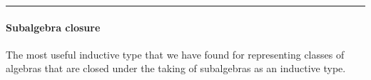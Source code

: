 \begin{center}\rule{0.5\linewidth}{\linethickness}\end{center}

\paragraph{Subalgebra closure}\label{subalgebra-closure}

The most useful inductive type that we have found for representing
classes of algebras that are closed under the taking of subalgebras as
an inductive type.

\begin{code}%
\>[0]\<%
\\
\>[0]\<%
\\
\>[0]\AgdaSpace{}%
\AgdaSpace{}%
\AgdaSymbol{\{}\AgdaSpace{}%
\AgdaSpace{}%
\AgdaSymbol{:}\AgdaSpace{}%
\AgdaSymbol{\}(}\AgdaSpace{}%
\AgdaSymbol{:}\AgdaSpace{}%
\AgdaSpace{}%
\AgdaSymbol{(}\AgdaSpace{}%
\AgdaSpace{}%
\AgdaSymbol{)}\AgdaSpace{}%
\AgdaSymbol{(}\AgdaSpace{}%
\AgdaSymbol{))}\AgdaSpace{}%
\AgdaSymbol{:}\AgdaSpace{}%
\AgdaSpace{}%
\AgdaSymbol{(}\AgdaSpace{}%
\AgdaSymbol{(}\AgdaSpace{}%
\AgdaSpace{}%
\AgdaSymbol{)}\AgdaSpace{}%
\AgdaSymbol{)}\AgdaSpace{}%
\AgdaSymbol{(}\AgdaSpace{}%
\AgdaSymbol{(}\AgdaSpace{}%
\AgdaSpace{}%
\AgdaSymbol{))}\AgdaSpace{}%
\<%
\\
\>[0][@{}l@{\AgdaIndent{0}}]%
\>[2]\AgdaSpace{}%
\AgdaSymbol{:}\AgdaSpace{}%
\AgdaSymbol{\{}\AgdaSpace{}%
\AgdaSymbol{:}\AgdaSpace{}%
\AgdaSpace{}%
\AgdaSpace{}%
\AgdaSymbol{\}}\AgdaSpace{}%
\AgdaSpace{}%
\AgdaSpace{}%
\AgdaSpace{}%
\AgdaSpace{}%
\AgdaSpace{}%
\AgdaSpace{}%
\AgdaSpace{}%
\AgdaSpace{}%
\AgdaSpace{}%
\AgdaSymbol{\{}\AgdaSymbol{\}\{}\AgdaSymbol{\}}\AgdaSpace{}%
\<%
\\
%
\>[2]\AgdaSpace{}%

\end{code}
